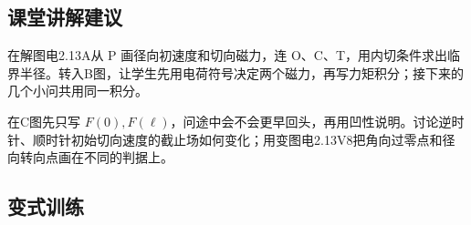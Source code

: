 \documentclass[UTF8,fontset=fandol,a4paper,11pt]{ctexart}
\begin{document}


\subsection*{课堂讲解建议}

在解图电2.13A从 P 画径向初速度和切向磁力，连 O、C、T，用内切条件求出临界半径。转入B图，让学生先用电荷符号决定两个磁力，再写力矩积分；接下来的几个小问共用同一积分。

在C图先只写 $F(0),F(\ell)$，问途中会不会更早回头，再用凹性说明。讨论逆时针、顺时针初始切向速度的截止场如何变化；用变图电2.13V8把角向过零点和径向转向点画在不同的判据上。


\subsection*{变式训练}
\end{document}
